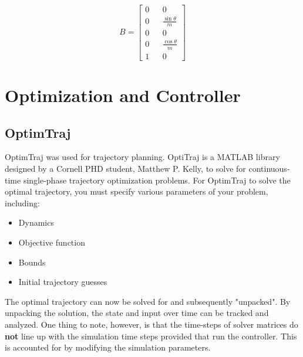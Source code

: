 \documentclass[12pt]{article}
\begin{document}
\begin{equation}
\label{B_matrix}
B = \begin{bmatrix} 0 && 0 \\ 0 && \frac{\sin{\theta}}{m} \\ 0 && 0 \\ 0 && \frac{\cos{\theta}}{m} \\ 1 && 0 \end{bmatrix}
\end{equation}


\section{Optimization and Controller}




\subsection{OptimTraj}

OptimTraj \cite{OptimTraj} was used for trajectory planning. OptiTraj is a MATLAB library designed by a Cornell PHD student, Matthew P. Kelly, to solve for continuous-time single-phase trajectory optimization problems. For OptimTraj to solve the optimal trajectory, you must specify various parameters of your problem, including:
\begin{itemize}
  \item Dynamics
  \item Objective function
  \item Bounds
  \item Initial trajectory guesses
\end{itemize}

The optimal trajectory can now be solved for and subsequently "unpacked". By unpacking the solution, the state and input over time can be tracked and analyzed. One thing to note, however, is that the time-steps of solver matrices do \textbf{not} line up with the simulation time steps provided that run the controller. This is accounted for by modifying the simulation parameters. 
\end{document}
